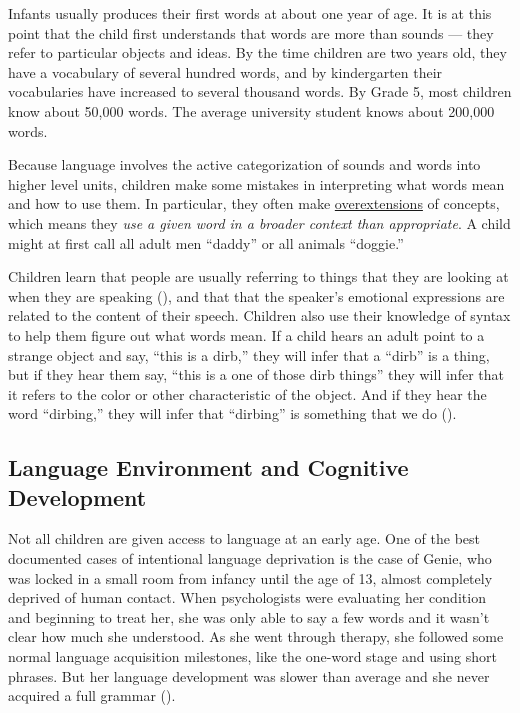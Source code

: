 \documentclass[
]{krantz}
\begin{document}
Infants usually produces their first words at about one year of age. It is at this point that the child first understands that words are more than sounds --- they refer to particular objects and ideas. By the time children are two years old, they have a vocabulary of several hundred words, and by kindergarten their vocabularies have increased to several thousand words. By Grade 5, most children know about 50,000 words. The average university student knows about 200,000 words.

Because language involves the active categorization of sounds and words into higher level units, children make some mistakes in interpreting what words mean and how to use them. In particular, they often make \hyperref[overextensions]{overextensions} of concepts, which means they \emph{use a given word in a broader context than appropriate}. A child might at first call all adult men ``daddy'' or all animals ``doggie.''

Children learn that people are usually referring to things that they are looking at when they are speaking (), and that that the speaker's emotional expressions are related to the content of their speech. Children also use their knowledge of syntax to help them figure out what words mean. If a child hears an adult point to a strange object and say, ``this is a dirb,'' they will infer that a ``dirb'' is a thing, but if they hear them say, ``this is a one of those dirb things'' they will infer that it refers to the color or other characteristic of the object. And if they hear the word ``dirbing,'' they will infer that ``dirbing'' is something that we do ().

\subsection*{Language Environment and Cognitive Development}\label{language-environment-and-cognitive-development}


Not all children are given access to language at an early age. One of the best documented cases of intentional language deprivation is the case of Genie, who was locked in a small room from infancy until the age of 13, almost completely deprived of human contact. When psychologists were evaluating her condition and beginning to treat her, she was only able to say a few words and it wasn't clear how much she understood. As she went through therapy, she followed some normal language acquisition milestones, like the one-word stage and using short phrases. But her language development was slower than average and she never acquired a full grammar ().
\end{document}
